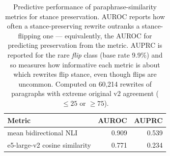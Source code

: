 \begin{table}[h]
  \centering
  \caption{Predictive performance of paraphrase-similarity metrics for stance preservation. AUROC reports how often a stance-preserving rewrite outranks a stance-flipping one — equivalently, the AUROC for predicting preservation from the metric. AUPRC is reported for the rare \emph{flip} class (base rate 9.9\%) and so measures how informative each metric is about which rewrites flip stance, even though flips are uncommon. Computed on 60,214 rewrites of paragraphs with extreme original v2 agreement ($\leq 25$ or $\geq 75$).}
  \label{tab:preservation-prediction}
  \begin{tabular}{lrr}
    \toprule
    Metric & AUROC & AUPRC \\
    \midrule
    mean bidirectional NLI           & 0.909 & 0.539 \\
    e5-large-v2 cosine similarity    & 0.771 & 0.234 \\
    \bottomrule
  \end{tabular}
\end{table}
